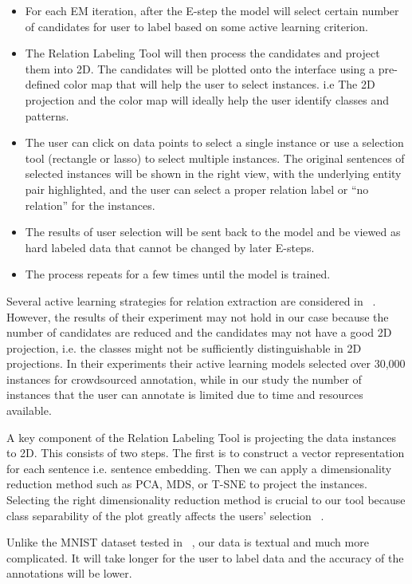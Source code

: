 \documentclass[11pt,a4paper]{article}
\begin{document}
	\begin{itemize}
		\item For each EM iteration, after the E-step the model will select certain number of candidates for user to label based on some active learning criterion.
		\item The Relation Labeling Tool will then process the candidates and project them into 2D. The candidates will be plotted onto the interface using a pre-defined color map that will help the user to select instances. i.e The 2D projection and the color map will ideally help the user identify classes and patterns.
		\item The user can click on data points to select a single instance or use a selection tool (rectangle or lasso) to select multiple instances. The original sentences of selected instances will be shown in the right view, with the underlying entity pair highlighted, and the user can select a proper relation label or ``no relation'' for the instances.
		\item The results of user selection will be sent back to the model and be viewed as hard labeled data that cannot be changed by later E-steps.
		\item The process repeats for a few times until the model is trained.
	\end{itemize}
	
	Several active learning strategies for relation extraction are considered in ~\citet{angeli2014combining}. However, the results of their experiment may not hold in our case because the number of candidates are reduced and the candidates may not have a good 2D projection, i.e. the classes might not be sufficiently distinguishable in 2D projections. In their experiments their active learning models selected over 30,000 instances for crowdsourced annotation, while in our study the number of instances that the user can annotate is limited due to time and resources available.
	
	A key component of the Relation Labeling Tool is projecting the data instances to 2D. This consists of two steps. The first is to construct a vector representation for each sentence i.e. sentence embedding. Then we can apply a dimensionality reduction method such as PCA, MDS, or T-SNE to project the instances. Selecting the right dimensionality reduction method is crucial to our tool because class separability of the plot greatly affects the users' selection ~\cite{bernard2018comparing}.
	
	Unlike the MNIST dataset tested in ~\cite{bernard2018comparing}, our data is textual and much more complicated. It will take longer for the user to label data and the accuracy of the annotations will be lower. 
	
\end{document}
